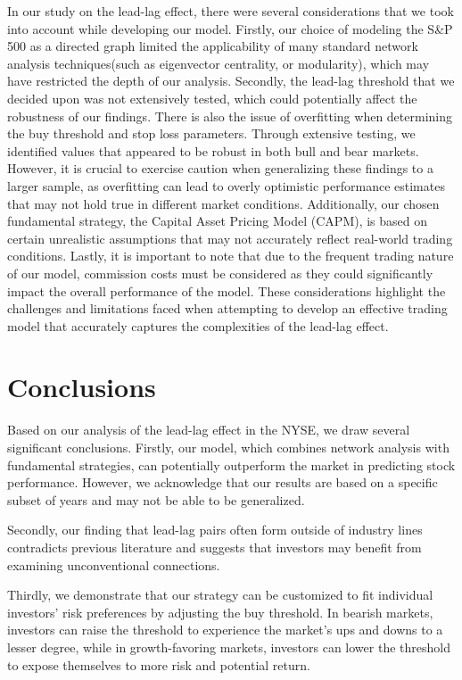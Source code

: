 \documentclass{article}
\begin{document}
In our study on the lead-lag effect, there were several considerations that we took into account
 while developing our model. Firstly, our choice of modeling the S\&P 500 as a directed graph limited the applicability of many standard network analysis techniques(such as eigenvector centrality, or modularity),
  which may have restricted the depth of our analysis. Secondly, the lead-lag threshold that we decided upon was not extensively tested, 
  which could potentially affect the robustness of our findings. 
  There is also the issue of overfitting when determining the buy threshold and stop loss parameters. Through extensive testing, we identified values that appeared to be robust in both bull and bear markets. However, it is crucial to exercise caution when generalizing these findings to a larger sample, as overfitting can lead to overly optimistic performance estimates that may not hold true in different market conditions. 
  Additionally, our chosen fundamental strategy, the Capital Asset Pricing Model (CAPM),
  is based on certain unrealistic assumptions that may not accurately reflect real-world trading conditions. Lastly, it is important to note that due to the frequent trading nature of our model, 
  commission costs must be considered as they could significantly impact the overall performance of the model. These considerations highlight the challenges and limitations
   faced when attempting to develop an effective trading model that accurately captures the complexities of the lead-lag effect.

\section{Conclusions}
Based on our analysis of the lead-lag effect in the NYSE, we draw several significant conclusions. Firstly, our model, which combines network analysis with fundamental strategies, can potentially outperform the market in predicting stock performance. However, we acknowledge that our results are based on a specific subset of years and may not be able to be generalized. 

Secondly, our finding that lead-lag pairs often form outside of industry lines contradicts previous literature and suggests that investors may benefit from examining unconventional connections. 

Thirdly, we demonstrate that our strategy can be customized to fit individual investors' risk preferences by adjusting the buy threshold. In bearish markets, investors can raise the threshold to experience the market's ups and downs to a lesser degree, while in growth-favoring markets, investors can lower the threshold to expose themselves to more risk and potential return. 
\end{document}
